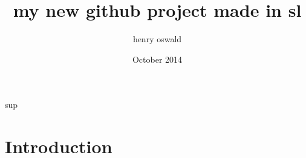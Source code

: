 \documentclass{article}
\title{my new github project made in sl}
\author{henry oswald}
\date{October 2014}
\begin{document}
\maketitle
sup

\section{Introduction}
\end{document}
